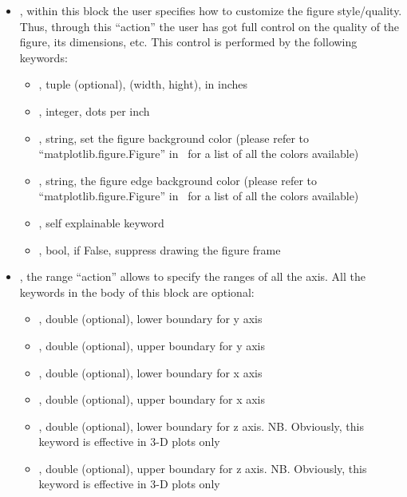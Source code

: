 \begin{itemize}
  \item {}, within this block the user specifies how to
  customize the figure style/quality.
  Thus, through this ``action'' the user has got full control on the quality of
  the figure, its dimensions, etc.
  This control is performed by the following keywords:
 \begin{itemize}
    \item \textit{}, tuple (optional), (width, hight), in inches
    \item \textit{}, integer, dots per inch
    \item \textit{}, string, set the figure background color
    (please refer to ``matplotlib.figure.Figure'' in~\cite{MatPlotLib} for a
    list of all the colors available)
    \item \textit{}, string, the figure edge background color
    (please refer to ``matplotlib.figure.Figure'' in~\cite{MatPlotLib} for a
    list of all the colors available)
    \item \textit{}, self explainable keyword
    \item \textit{}, bool, if False, suppress drawing the figure
    frame
      \end{itemize}
  \item {}, the range ``action'' allows to specify the ranges of all the
  axis.
  All the keywords in the body of this block are optional:
     \begin{itemize}
    \item \textit{}, double (optional), lower boundary for y axis
    \item \textit{}, double (optional), upper boundary for y axis
    \item \textit{}, double (optional), lower boundary for x axis
    \item \textit{}, double (optional), upper boundary for x axis
    \item \textit{}, double (optional), lower boundary for z axis.
    NB.
    Obviously, this keyword is effective in 3-D plots only
    \item \textit{}, double (optional), upper boundary for z axis.
    NB.
    Obviously, this keyword is effective in 3-D plots only
      \end{itemize}

\end{itemize}
